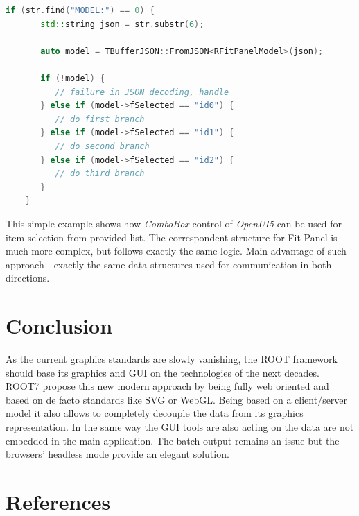 \documentclass[a4paper]{jpconf}
\begin{document}
\begin{lstlisting}[language=C++,numbers=none]
    if (str.find("MODEL:") == 0) {
       std::string json = str.substr(6);

       auto model = TBufferJSON::FromJSON<RFitPanelModel>(json);

       if (!model) {
          // failure in JSON decoding, handle
       } else if (model->fSelected == "id0") {
          // do first branch
       } else if (model->fSelected == "id1") {
          // do second branch
       } else if (model->fSelected == "id2") {
          // do third branch
       }
    }
\end{lstlisting}

This simple example shows how \textit{ComboBox} control of \textit{OpenUI5} can be used for item selection from provided list.
The correspondent structure for Fit Panel is much more complex, but follows exactly the same logic. 
Main advantage of such approach - exactly the same data structures used for communication in both directions.


\section{Conclusion}

As the current graphics standards are slowly vanishing, the ROOT framework should
base its graphics and GUI on the technologies of the next decades. ROOT7 propose
this new modern approach by being fully web oriented and based on de facto standards
like SVG or WebGL. Being based on a client/server model it also allows to completely
decouple the data from its graphics representation. In the same way the GUI tools
are also acting on the data are not embedded in the main application.
The batch output remains an issue but the browsers' headless mode provide an elegant solution.


\section{References}

\end{document}
